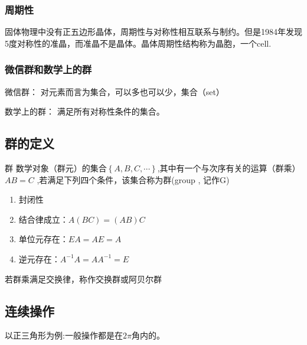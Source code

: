 \documentclass[math=mtpro2,lang=cn,color=green]{elegantbook}
\begin{document}
\subsubsection{周期性}

固体物理中没有正五边形晶体，周期性与对称性相互联系与制约。但是1984年发现5度对称性的准晶，而准晶不是晶体。晶体周期性结构称为晶胞，一个cell.

\subsubsection{微信群和数学上的群}

微信群： 对元素而言为集合，可以多也可以少，集合（set） 

数学上的群： 满足所有对称性条件的集合。

\subsection{群的定义}

\begin{definition}{群}
   数学对象（群元）的集合$\left\{ A,B,C,\cdots \right\}$,其中有一个与次序有关的运算（群乘）$AB=C$ ,若满足下列四个条件，该集合称为群(group , 记作G)
   \begin{enumerate}
      \item 封闭性
      \item 结合律成立：$A(BC)=(AB)C$
      \item 单位元存在：$EA=AE=A$
      \item 逆元存在：$A^{-1}A=AA^{-1}=E$
   \end{enumerate}
   \label{def:group1}
\end{definition}

\begin{note}
   若群乘满足交换律，称作交换群或阿贝尔群
\end{note}

\subsection{连续操作}

以正三角形为例:一般操作都是在$2\pi$角内的。
\end{document}
